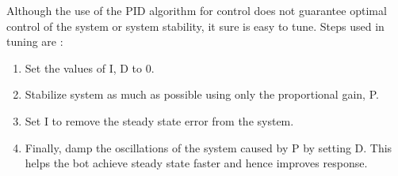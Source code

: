 Although the use of the PID algorithm for control does not guarantee optimal control of the system or system stability, it sure is easy to tune.\newline
Steps used in tuning are :
\begin{enumerate}
  \item Set the values of I, D to 0.
  \item Stabilize system as much as possible using only the proportional gain, P.
  \item Set I to remove the steady state error from the system.
  \item Finally, damp the oscillations of the system caused by P by setting D. This helps the bot achieve steady state faster and hence improves response.
\end{enumerate}
